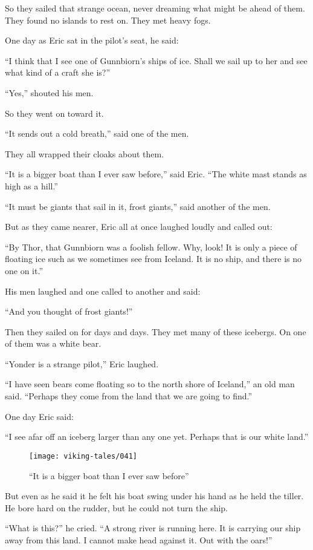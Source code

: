 So they sailed that strange ocean, never dreaming what might be ahead of
them. They found no islands to rest on. They met heavy fogs.

One day as Eric sat in the pilot's seat, he said:

``I think that I see one of Gunnbiorn's ships of ice. Shall we sail up
to her and see what kind of a craft she is?''

``Yes,'' shouted his men.

So they went on toward it.

``It sends out a cold breath,'' said one of the men.

They all wrapped their cloaks about them.

``It is a bigger boat than I ever saw before,'' said Eric. ``The white
mast stands as high as a hill.''

``It must be giants that sail in it, frost giants,'' said another of the
men.

But as they came nearer, Eric all at once laughed loudly and called out:

``By Thor, that Gunnbiorn was a foolish fellow. Why, look! It is only a
piece of floating ice such as we sometimes see from Iceland. It is no
ship, and there is no one on it.''

His men laughed and one called to another and said:

``And you thought of frost giants!''

Then they sailed on for days and days. They met many of these icebergs.
On one of them was a white bear.

``Yonder is a strange pilot,'' Eric laughed.

``I have seen bears come floating so to the north shore of Iceland,'' an
old man said. ``Perhaps they come from the land that we are going to
find.''

One day Eric said:

``I see afar off an iceberg larger than any one yet. Perhaps that is our
white land.''

\begin{figure}[ht]
    \centering
    \texttt{[image: viking-tales/041]}
    \caption{``It is a bigger boat than I ever saw before''}
\end{figure}

But even as he said it he felt his boat swing under his hand as he held
the tiller. He bore hard on the rudder, but he could not turn the ship.

``What is this?'' he cried. ``A strong river is running here. It is
carrying our ship away from this land. I cannot make head against it.
Out with the oars!''

